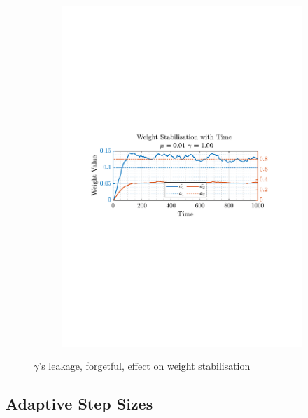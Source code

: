 \documentclass[12pt]{article}
\begin{document}
\begin{figure}[H]
\begin{subfigure}{0.49\textwidth}
					\includegraphics[trim={2.2cm 11.2cm 3.00cm  11.2cm}, clip, width=\textwidth]{../MATLAB/figures/q2_1f_fig08.pdf} 
					\captionsetup{justification=centering}
				\end{subfigure}
				\captionsetup{justification=centering}
				\caption{$\gamma$'s leakage, forgetful, effect on weight stabilisation}
				\label{fig: 2-1f}
			\end{figure}
	\subsection{Adaptive Step Sizes} \label{sec: 2-2-adaptive-step}
\end{document}
